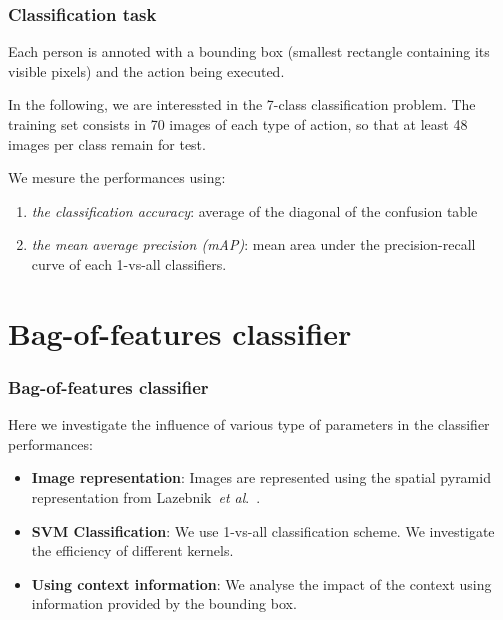 \documentclass{beamer}
\def\etal{\emph{et al}.}
\begin{document}

\begin{frame}
\frametitle{Classification task}
Each person is annoted with a bounding box (smallest rectangle containing its visible pixels)
and the action being executed.

\vspace{0.3cm}
In the following, we are interessted in the 7-class classification problem.
The training set consists in 70 images of each type of action, so that at least 48 images
per class remain for test.

\vspace{0.3cm}
We mesure the performances using:
\begin{enumerate}[i]
\item {\em the classification accuracy}: average of the diagonal of the confusion table
\item {\em the mean average precision (mAP)}: mean area under the precision-recall curve of each 1-vs-all classifiers.
\end{enumerate}

\end{frame}


\section{Bag-of-features classifier}

\begin{frame}
\frametitle{Bag-of-features classifier}
Here we investigate the influence of various type of parameters in the classifier
performances:

\begin{itemize}
\item \textbf{Image representation}: Images are represented using the spatial pyramid 
representation from Lazebnik~\etal~.
\item \textbf{SVM Classification}: We use 1-vs-all classification scheme. We investigate
the efficiency of different kernels.
\item \textbf{Using context information}: We analyse the impact of the context using
information provided by the bounding box.
\end{itemize}

\end{frame}
\end{document}
